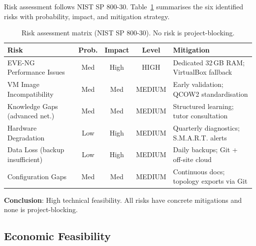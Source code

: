 Risk assessment follows NIST SP 800-30\cite{nist_sp80030}. Table~\ref{tab:risk_matrix}
summarises the six identified risks with probability, impact, and mitigation strategy.

\begin{table}[H]
  \centering
  \footnotesize
  \setlength{\tabcolsep}{3pt}
  \renewcommand{\arraystretch}{1.1}
  \begin{tabularx}{\textwidth}{XcccX}
    \toprule
    \textbf{Risk} & \textbf{Prob.} & \textbf{Impact} & \textbf{Level} & \textbf{Mitigation} \\
    \midrule
    EVE-NG Performance Issues       & Med & High & HIGH   & Dedicated 32\,GB RAM; VirtualBox fallback \\
    VM Image Incompatibility        & Med & Med  & MEDIUM & Early validation; QCOW2 standardisation \\
    Knowledge Gaps (advanced net.)  & Med & Med  & MEDIUM & Structured learning; tutor consultation \\
    Hardware Degradation            & Low & High & MEDIUM & Quarterly diagnostics; S.M.A.R.T. alerts \\
    Data Loss (backup insufficient) & Low & High & MEDIUM & Daily backups; Git + off-site cloud \\
    Configuration Gaps              & Med & Med  & MEDIUM & Continuous docs; topology exports via Git \\
    \bottomrule
  \end{tabularx}
  \caption[Risk assessment]{Risk assessment matrix (NIST SP 800-30). No risk is project-blocking.}
  \label{tab:risk_matrix}
\end{table}

\textbf{Conclusion}: High technical feasibility. All risks have concrete mitigations and none
is project-blocking.
\newpage
\subsection{Economic Feasibility}

